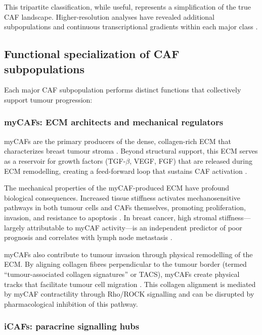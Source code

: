 This tripartite classification, while useful, represents a simplification of the true CAF landscape. Higher-resolution analyses have revealed additional subpopulations and continuous transcriptional gradients within each major class \citep{wu2020single}.

\subsection{Functional specialization of CAF subpopulations}

Each major CAF subpopulation performs distinct functions that collectively support tumour progression:

\subsubsection{myCAFs: ECM architects and mechanical regulators}

myCAFs are the primary producers of the dense, collagen-rich ECM that characterizes breast tumour stroma \citep{erve2024}. Beyond structural support, this ECM serves as a reservoir for growth factors (TGF-$\beta$, VEGF, FGF) that are released during ECM remodelling, creating a feed-forward loop that sustains CAF activation \citep{lu2012tumor}.

The mechanical properties of the myCAF-produced ECM have profound biological consequences. Increased tissue stiffness activates mechanosensitive pathways in both tumour cells and CAFs themselves, promoting proliferation, invasion, and resistance to apoptosis \citep{levental2009matrix}. In breast cancer, high stromal stiffness---largely attributable to myCAF activity---is an independent predictor of poor prognosis and correlates with lymph node metastasis \citep{levental2009matrix}.

myCAFs also contribute to tumour invasion through physical remodelling of the ECM. By aligning collagen fibres perpendicular to the tumour border (termed ``tumour-associated collagen signatures'' or TACS), myCAFs create physical tracks that facilitate tumour cell migration \citep{provenzano2006collagen}. This collagen alignment is mediated by myCAF contractility through Rho/ROCK signalling and can be disrupted by pharmacological inhibition of this pathway.

\subsubsection{iCAFs: paracrine signalling hubs}

